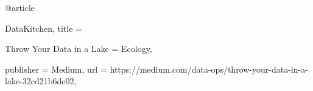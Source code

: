 @article {DataKitchen,
title = {Throw Your Data in a Lake = {Ecology},

publisher = {Medium},
url = {https://medium.com/data-ops/throw-your-data-in-a-lake-32cd21b6de02},
}
}